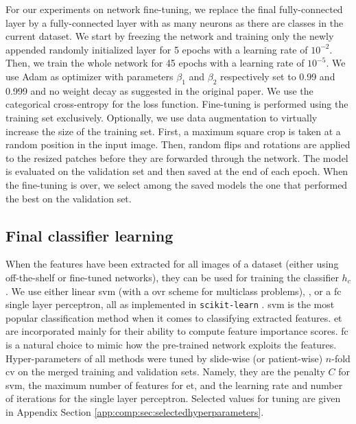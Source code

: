 For our experiments on network fine-tuning, we replace the final fully-connected layer by a fully-connected layer with as many neurons as there are classes in the current dataset. We start by freezing the network and training only the newly appended randomly initialized layer for 5 epochs with a learning rate of $10^{-2}$. Then, we train the whole network for 45 epochs with a learning rate of $10^{-5}$. We use Adam \parencite{kingma2014adam} as optimizer with parameters $\beta_1$ and $\beta_2$ respectively set to 0.99 and 0.999 and no weight decay as suggested in the original paper. We use the categorical cross-entropy for the loss function. Fine-tuning is performed using the training set exclusively. Optionally, we use data augmentation to virtually increase the size of the training set. First, a maximum square crop is taken at a random position in the input image. %
Then, random flips and rotations are applied to the resized patches before they are forwarded through the network. The model is evaluated on the validation set and then saved at the end of each epoch. When the fine-tuning is over, we select among the saved models the one that performed the best on the validation set.

\subsection{Final classifier learning}
When the features have been extracted for all images of a dataset (either using off-the-shelf or fine-tuned networks), they can be used for training the classifier $h_c$. 
We use either linear \acrshort{svm} \parencite{boser1992training} (with a \acrlong{ovr} scheme for multiclass problems),  \parencite{geurts2006extremely}, or a \acrlong{fc} single layer perceptron, all as implemented in \texttt{scikit-learn} \parencite{scikit-learn}. \acrshort{svm} is the most popular classification method when it comes to classifying extracted features. \acrshort{et} are incorporated mainly for their ability to compute feature importance scores. \acrshort{fc} is a natural choice to mimic how the pre-trained network exploits the features. Hyper-parameters of all methods were tuned by slide-wise (or patient-wise) $n$-fold \acrlong{cv} on the merged training and validation sets. Namely, they are the penalty $C$ for \acrshort{svm}, the maximum number of features for \acrshort{et}, and the learning rate and number of iterations for the single layer perceptron. Selected values for tuning are given in Appendix Section \ref{app:comp:sec:selectedhyperparameters}.

